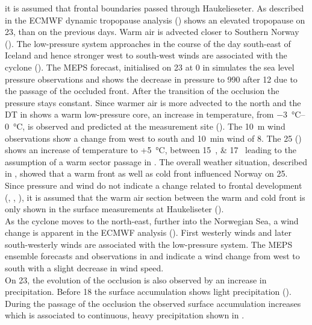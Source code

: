 it is assumed that frontal boundaries passed through Haukelieseter. 
As described in  the ECMWF dynamic tropopause analysis () shows an elevated tropopause %
on \SI{23}{\dec}, than on the previous days. Warm air is advected closer to Southern Norway (). The low-pressure system approaches in the course of the day south-east of Iceland and hence stronger west to south-west winds are associated with the cyclone (). The MEPS forecast, initialised on \SI{23}{\dec} at \SI{0}{\UTC} in  simulates the sea level pressure observations and shows the decrease in pressure to \SI{990}{\hPa} after \SI{12}{\UTC} due to the passage of the occluded front. After the transition of the occlusion the pressure stays constant. Since warmer air is more advected to the north and the DT in  shows a warm low-pressure core, an increase in temperature, from \SIrange{-3}{0}{\celsius}, is observed and predicted at the measurement site (). The \SI{10}{\metre} wind observations show a change from west to south and \SI{10}{\minute} wind of \SI{8}{\mPs}.
The \SI{25}{\dec} () shows an increase of temperature to +\SI{5}{\celsius}, between \SIlist{15;17}{\UTC} leading to the assumption of a warm sector passage in . The overall weather situation, described in , showed that a warm front as well as cold front influenced Norway on \SI{25}{\dec}. Since pressure and wind do not indicate a change related to frontal development (, , ), it is assumed that the warm air section between the warm and cold front is only shown in the surface measurements at Haukeliseter ().  
\\
As the cyclone moves to the north-east, further into the Norwegian Sea, a wind change is apparent in the ECMWF analysis (). First westerly winds and later south-westerly winds are associated with the low-pressure system. The MEPS ensemble forecasts and observations in  and  indicate a wind change from west to south with a slight decrease in wind speed.
\\
On \SI{23}{\dec}, the evolution of the occlusion is also observed by an increase in precipitation. Before \SI{18}{\UTC} the surface accumulation shows light precipitation (). During the passage of the occlusion the observed surface accumulation increases which is associated to continuous, heavy precipitation shown in .
